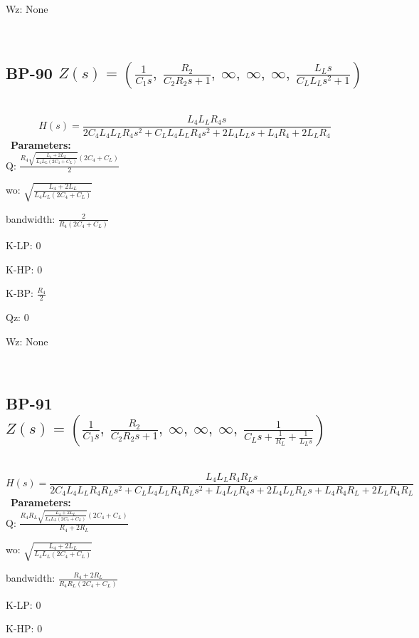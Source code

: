 \documentclass{article}
\begin{document}
Wz: $\text{None}$\ 

\ 

\subsection{BP-90 $Z(s) = \left( \frac{1}{C_{1} s}, \  \frac{R_{2}}{C_{2} R_{2} s + 1}, \  \infty, \  \infty, \  \infty, \  \frac{L_{L} s}{C_{L} L_{L} s^{2} + 1}\right)$ } \ 
\textbf{\[H(s) = \frac{L_{4} L_{L} R_{4} s}{2 C_{4} L_{4} L_{L} R_{4} s^{2} + C_{L} L_{4} L_{L} R_{4} s^{2} + 2 L_{4} L_{L} s + L_{4} R_{4} + 2 L_{L} R_{4}}\] } \ 
\textbf{Parameters:}\\ 

Q: $\frac{R_{4} \sqrt{\frac{L_{4} + 2 L_{L}}{L_{4} L_{L} \left(2 C_{4} + C_{L}\right)}} \left(2 C_{4} + C_{L}\right)}{2}$\ 

wo: $\sqrt{\frac{L_{4} + 2 L_{L}}{L_{4} L_{L} \left(2 C_{4} + C_{L}\right)}}$\ 

bandwidth: $\frac{2}{R_{4} \left(2 C_{4} + C_{L}\right)}$\ 

K-LP: $0$\ 

K-HP: $0$\ 

K-BP: $\frac{R_{4}}{2}$\ 

Qz: $0$\ 

Wz: $\text{None}$\ 

\ 

\subsection{BP-91 $Z(s) = \left( \frac{1}{C_{1} s}, \  \frac{R_{2}}{C_{2} R_{2} s + 1}, \  \infty, \  \infty, \  \infty, \  \frac{1}{C_{L} s + \frac{1}{R_{L}} + \frac{1}{L_{L} s}}\right)$ } \ 
\textbf{\[H(s) = \frac{L_{4} L_{L} R_{4} R_{L} s}{2 C_{4} L_{4} L_{L} R_{4} R_{L} s^{2} + C_{L} L_{4} L_{L} R_{4} R_{L} s^{2} + L_{4} L_{L} R_{4} s + 2 L_{4} L_{L} R_{L} s + L_{4} R_{4} R_{L} + 2 L_{L} R_{4} R_{L}}\] } \ 
\textbf{Parameters:}\\ 

Q: $\frac{R_{4} R_{L} \sqrt{\frac{L_{4} + 2 L_{L}}{L_{4} L_{L} \left(2 C_{4} + C_{L}\right)}} \left(2 C_{4} + C_{L}\right)}{R_{4} + 2 R_{L}}$\ 

wo: $\sqrt{\frac{L_{4} + 2 L_{L}}{L_{4} L_{L} \left(2 C_{4} + C_{L}\right)}}$\ 

bandwidth: $\frac{R_{4} + 2 R_{L}}{R_{4} R_{L} \left(2 C_{4} + C_{L}\right)}$\ 

K-LP: $0$\ 

K-HP: $0$\ 
\end{document}
